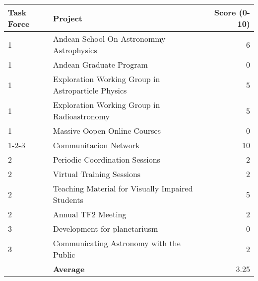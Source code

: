 \begin{table}[!h]
\begin{center}
\begin{tabular}{lp{9cm}r}
Task Force & Project & Score (0-10)\\\hline
1 & Andean School On Astronommy Astrophysics & 6\\
1 & Andean Graduate Program & 0 \\
1 & Exploration Working Group in Astroparticle Physics & 5\\
1 & Exploration Working Group in Radioastronomy & 5\\
1 & Massive Oopen Online Courses & 0 \\ 
1-2-3 & Communitacion Network & 10\\
2  & Periodic Coordination Sessions & 2\\
2 & Virtual Training Sessions & 2\\
2 & Teaching Material for Visually Impaired Students & 5\\
2 & Annual TF2 Meeting & 2\\
3 & Development for planetariusm & 0\\
3 & Communicating Astronomy with the Public & 2\\\hline
 & \textbf{Average} & 3.25\\ 
\end{tabular}
\end{center}
\end{table}


